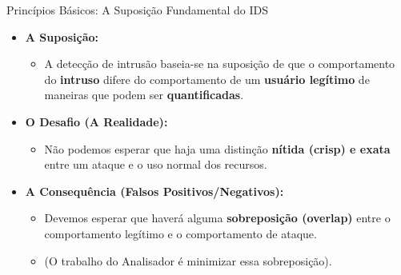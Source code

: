 \begin{frame}{Princípios Básicos: A Suposição Fundamental do IDS}
    \begin{itemize}
        \item \textbf{A Suposição:}
              \begin{itemize}
                  \item A detecção de intrusão baseia-se na suposição de que o comportamento do \textbf{intruso} difere do comportamento de um \textbf{usuário legítimo} de maneiras que podem ser \textbf{quantificadas}.
              \end{itemize}

        \item \textbf{O Desafio (A Realidade):}
              \begin{itemize}
                  \item Não podemos esperar que haja uma distinção \textbf{nítida (crisp) e exata} entre um ataque e o uso normal dos recursos.
              \end{itemize}

        \item \textbf{A Consequência (Falsos Positivos/Negativos):}
              \begin{itemize}
                  \item Devemos esperar que haverá alguma \textbf{sobreposição (overlap)} entre o comportamento legítimo e o comportamento de ataque.
                  \item (O trabalho do Analisador é minimizar essa sobreposição).
              \end{itemize}
    \end{itemize}
\end{frame}

